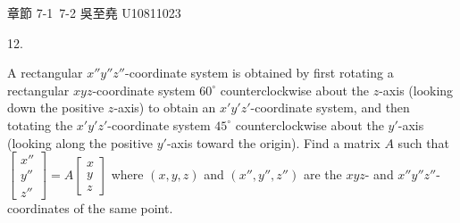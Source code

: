 \documentclass[12pt]{book}
\author{andersonwu2000}
\begin{document}
\begin{CJK}{UTF8}{bsmi}

\hfill 章節 7-1~7-2 吳至堯 U10811023


12. \begin{minipage}[t]{\dimexpr\linewidth-2em}
A rectangular $x''y''z''$-coordinate system is obtained by first rotating a rectangular $xyz$-coordinate system $60^\circ$ counterclockwise about the $z$-axis (looking down the positive $z$-axis) to obtain an $x'y'z'$-coordinate system, and then totating the $x'y'z'$-coordinate system $45^\circ$ counterclockwise about the $y'$-axis (looking along the positive $y'$-axis toward the origin). Find a matrix $A$ such that $\begin{bmatrix}
x'' \\ y'' \\ z''
\end{bmatrix}=A\begin{bmatrix}
x \\ y \\ z
\end{bmatrix}$ where $(x,y,z)$ and $(x'', y'', z'')$ are the $xyz$- and $x''y''z''$-coordinates of the same point. \\


\end{minipage}
\end{CJK}
\end{document}
